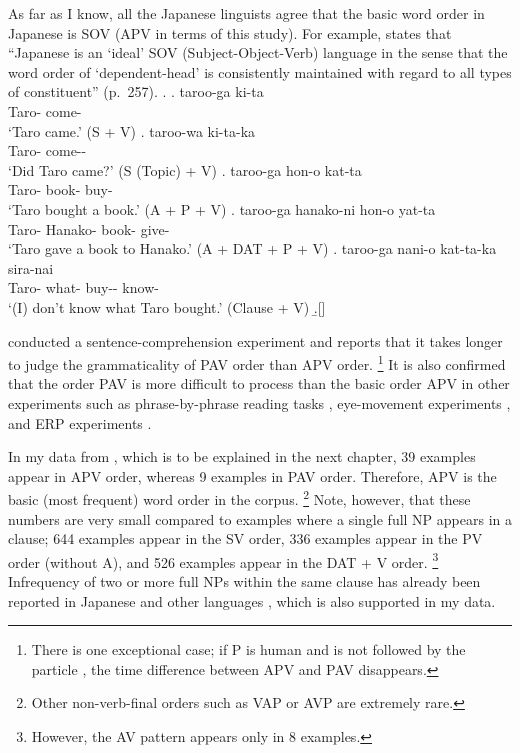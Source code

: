 As far as I know,
all the Japanese linguists agree that
the basic word order in Japanese is SOV (APV in terms of this study).
For example,
 states that
``Japanese is an `ideal' SOV (Subject-Object-Verb) language
in the sense that the word order of `dependent-head' is consistently maintained with regard to all types of constituent'' (p.~257).
%
\ex.
 \ag. taroo-ga ki-ta \\
      Taro- come- \\
      `Taro came.' \hfill{(S + V)}
 \bg. taroo-wa ki-ta-ka \\
      Taro- come-- \\
      `Did Taro came?'  \hfill{(S (Topic) + V)}
 \bg. taroo-ga hon-o kat-ta \\
      Taro- book- buy- \\
      `Taro bought a book.' \hfill{(A + P + V)}
 \bg. taroo-ga hanako-ni hon-o yat-ta \\
      Taro- Hanako- book- give- \\
      `Taro gave a book to Hanako.' \hfill{(A + DAT + P + V)}
 \bg. taroo-ga nani-o kat-ta-ka sira-nai \\
      Taro- what- buy-- know- \\
      `(I) don't know what Taro bought.'  \hfill{(Clause + V)}
 \b.[]     \hfill{\cite[p.~257--258]{shibatani90}}


 conducted a sentence-comprehension experiment and
reports that it takes longer to judge the grammaticality of PAV order than APV order.%
 \footnote{
 There is one exceptional case;
 if P is human and is not followed by the particle ,
 the time difference between APV and PAV disappears.
 }
It is also confirmed that
the order PAV is more difficult to process than the basic order APV
in other experiments such as
phrase-by-phrase reading tasks \cite{miyamototakahashi02},
eye-movement experiments \cite{mazukaetal02}, and
ERP experiments \cite{uenokluender03}.

In my data from ,
which is to be explained in the next chapter,
39 examples appear in APV order,
whereas 9 examples in PAV order.
Therefore, APV is the basic (most frequent) word order in the corpus.%
 \footnote{
 Other non-verb-final orders such as VAP or AVP are extremely rare.
 }
Note, however, that
these numbers are very small compared to
examples where a single full NP appears in a clause;
644 examples appear in the SV order,
336 examples appear in the PV order (without A), and
526 examples appear in the DAT + V order.%
 \footnote{
 However, the AV pattern appears only in 8 examples.
 }
Infrequency of two or more full NPs within the same clause
has already been reported in Japanese \cite{matsumoto03} and other languages \cite{dubois87,dryer97},
which is also supported in my data.


